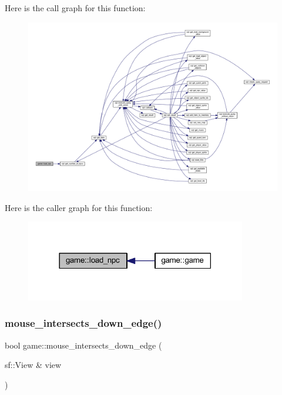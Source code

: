 Here is the call graph for this function\+:
\nopagebreak
\begin{figure}[H]
\begin{center}
\leavevmode
\includegraphics[width=350pt]{classgame_a3718980f99cd44e9c882c2aa67368450_cgraph}
\end{center}
\end{figure}
Here is the caller graph for this function\+:
\nopagebreak
\begin{figure}[H]
\begin{center}
\leavevmode
\includegraphics[width=273pt]{classgame_a3718980f99cd44e9c882c2aa67368450_icgraph}
\end{center}
\end{figure}
\mbox{\label{classgame_a34a5241e205d0985a9e477a3dd77ba08}} 
\subsubsection{\texorpdfstring{mouse\+\_\+intersects\+\_\+down\+\_\+edge()}{mouse\_intersects\_down\_edge()}}
{\footnotesize\ttfamily bool game\+::mouse\+\_\+intersects\+\_\+down\+\_\+edge (\begin{DoxyParamCaption}\item[{sf\+::\+View \&}]{view }\end{DoxyParamCaption})\hspace{0.3cm}{\ttfamily [private]}}



